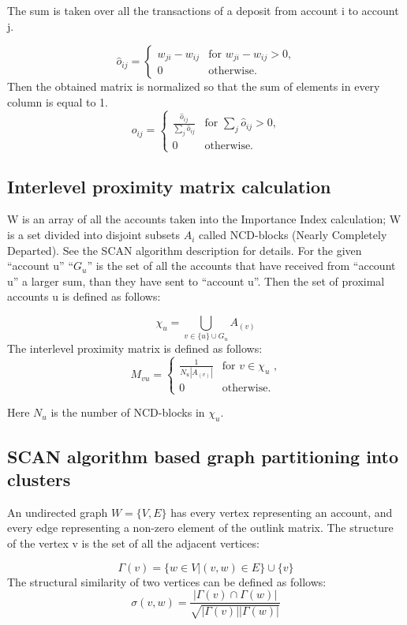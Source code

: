 \documentclass[a4paper,12pt]{article}
\begin{document}
The sum is taken over all the transactions of a deposit from account i to account j.

$$
\hat{o}_{ij} = \begin{cases}
 w_{ji}-w_{ij}
 & \text{for $w_{ji}-w_{ij} > 0$,}\\
 0 & \text{otherwise.}
\end{cases}
$$
Then the obtained matrix is normalized so that the sum of elements in every column is equal
to 1.
$$
o_{ij} = \begin{cases}
 \frac{\hat{o}_{ij}} {\sum\limits_{j} \hat{o}_{ij}}
 & \text{for $\sum\limits_{j} \hat{o}_{ij}> 0$,}\\
 0 & \text{otherwise.}
\end{cases} 
$$

\subsection{Interlevel proximity matrix calculation}
W is an array of all the accounts taken into the Importance Index calculation; W is a set
divided into disjoint subsets $A_i$ called NCD-blocks (Nearly Completely Departed). See the
SCAN algorithm description for details. For the given “account u” “$G_u$” is the set of all the
accounts that have received from “account u” a larger sum, than they have sent to “account
u”. Then the set of proximal accounts u is defined as follows:

$$
\chi_u = \bigcup_{v \in \{u\} \cup G_u} A_{(v)}
$$
The interlevel proximity matrix is defined as follows:
$$
M_{vu}=\begin{cases}
 \frac{1}{N_u |A_{(v)}|}
 & \text{for $v \in \chi_u$ ,}\\
 0 & \text{otherwise.}
\end{cases}
$$

Here $N_u$ is the number of NCD-blocks in $\chi_u$.

\subsection{SCAN algorithm based graph partitioning into clusters}
An undirected graph $W = \{V, E\}$ has every vertex representing an account, and every edge
representing a non-zero element of the outlink matrix. The structure of the vertex v is the set of all the adjacent vertices:

$$
\Gamma(v)=\{w \in V|(v,w) \in E\} \cup \{v\}
$$
The structural similarity of two vertices can be defined as follows:
$$
\sigma(v,w)=\frac{ |\Gamma(v) \cap \Gamma(w)|}{\sqrt{|\Gamma(v)||\Gamma(w)|}}
$$
\end{document}

